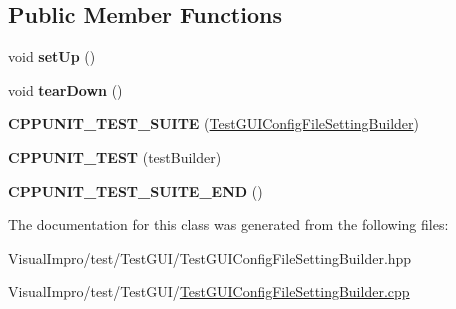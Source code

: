 \subsection*{Public Member Functions}
\begin{DoxyCompactItemize}
\item 
\mbox{\label{class_test_g_u_i_config_file_setting_builder_af38b551d3e948b59f622dc2292141570}} 
void {\bfseries set\+Up} ()
\item 
\mbox{\label{class_test_g_u_i_config_file_setting_builder_a68ae62b29aa5efe3bf934b62bd96be25}} 
void {\bfseries tear\+Down} ()
\item 
\mbox{\label{class_test_g_u_i_config_file_setting_builder_a142b4fed090a48d552c592bffc0024ba}} 
{\bfseries C\+P\+P\+U\+N\+I\+T\+\_\+\+T\+E\+S\+T\+\_\+\+S\+U\+I\+TE} (\mbox{\hyperlink{class_test_g_u_i_config_file_setting_builder}{Test\+G\+U\+I\+Config\+File\+Setting\+Builder}})
\item 
\mbox{\label{class_test_g_u_i_config_file_setting_builder_acccec97c2bebd1445568e2f99c55cffb}} 
{\bfseries C\+P\+P\+U\+N\+I\+T\+\_\+\+T\+E\+ST} (test\+Builder)
\item 
\mbox{\label{class_test_g_u_i_config_file_setting_builder_a5ab10dba00fc004d69a824b30badc10f}} 
{\bfseries C\+P\+P\+U\+N\+I\+T\+\_\+\+T\+E\+S\+T\+\_\+\+S\+U\+I\+T\+E\+\_\+\+E\+ND} ()
\end{DoxyCompactItemize}


The documentation for this class was generated from the following files\+:\begin{DoxyCompactItemize}
\item 
Visual\+Impro/test/\+Test\+G\+U\+I/Test\+G\+U\+I\+Config\+File\+Setting\+Builder.\+hpp\item 
Visual\+Impro/test/\+Test\+G\+U\+I/\mbox{\hyperlink{_test_g_u_i_config_file_setting_builder_8cpp}{Test\+G\+U\+I\+Config\+File\+Setting\+Builder.\+cpp}}\end{DoxyCompactItemize}
